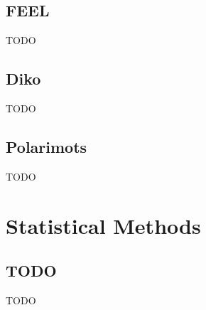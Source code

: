 \subsection{FEEL}\label{chap: feel}

TODO

\subsection{Diko}\label{chap: diko}

TODO

\subsection{Polarimots}\label{chap: polarimots}

TODO

\section{Statistical Methods}\label{Statistical Methods}

\subsection{TODO}

TODO
